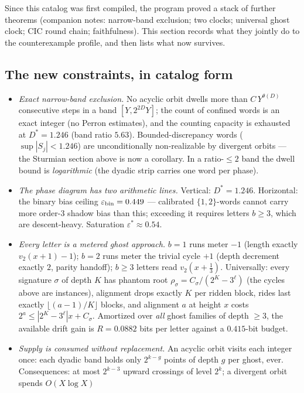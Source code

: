 \documentclass[10pt]{article}
\begin{document}
Since this catalog was first compiled, the program proved a stack of
further theorems (companion notes: narrow-band exclusion; two clocks;
universal ghost clock; CIC round chain; faithfulness). This section
records what they jointly do to the counterexample profile, and then
lists what now survives.

\subsection*{The new constraints, in catalog form}
\begin{itemize}
\item \emph{Exact narrow-band exclusion.} No acyclic orbit dwells more
than $C\,Y^{\theta(D)}$ consecutive steps in a band $[Y,2^{2D}Y]$; the
count of confined words is an exact integer (no Perron estimates), and
the counting capacity is exhausted at $D^*=1.246$ (band ratio $5.63$).
Bounded-discrepancy words ($\sup|S_j|<1.246$) are unconditionally
non-realizable by divergent orbits --- the Sturmian section above is
now a corollary. In a ratio-$\le2$ band the dwell bound is
\emph{logarithmic} (the dyadic strip carries one word per phase).
\item \emph{The phase diagram has two arithmetic lines.} Vertical:
$D^*=1.246$. Horizontal: the binary bias ceiling
$\varepsilon_{\rm bin}=0.449$ --- calibrated $\{1,2\}$-words cannot
carry more order-3 shadow bias than this; exceeding it requires
letters $b\ge3$, which are descent-heavy. Saturation
$\varepsilon^*\approx0.54$.
\item \emph{Every letter is a metered ghost approach.} $b{=}1$ runs
meter $-1$ (length exactly $v_2(x+1)-1$); $b{=}2$ runs meter the
trivial cycle $+1$ (depth decrement exactly $2$, parity handoff);
$b\ge3$ letters read $v_2(x+\tfrac13)$. Universally: every signature
$\sigma$ of depth $K$ has phantom root
$\rho_\sigma=C_\sigma/(2^K-3^\ell)$ (the cycles above are instances),
alignment drops exactly $K$ per ridden block, rides last exactly
$\lfloor(a-1)/K\rfloor$ blocks, and alignment $a$ at height $x$ costs
$2^a\le|2^K-3^\ell|x+C_\sigma$. Amortized over \emph{all} ghost
families of depth $\ge3$, the available drift gain is
$R=0.0882$ bits per letter against a $0.415$-bit budget.
\item \emph{Supply is consumed without replacement.} An acyclic orbit
visits each integer once: each dyadic band holds only $2^{k-g}$ points
of depth $g$ per ghost, ever. Consequences: at most $2^{k-3}$ upward
crossings of level $2^k$; a divergent orbit spends $O(X\log X)$

\end{itemize}
\end{document}
